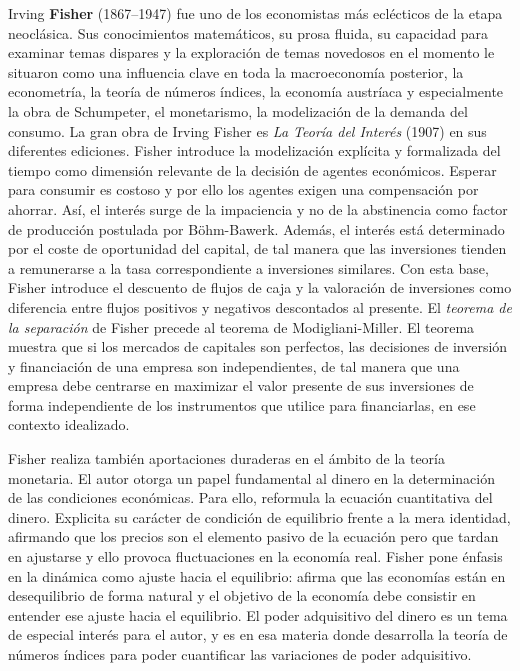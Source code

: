 \documentclass{nuevotema}
\begin{document}
Irving \textbf{Fisher} (1867--1947) fue uno de los economistas más eclécticos de la etapa neoclásica. Sus conocimientos matemáticos, su prosa fluida, su capacidad para examinar temas dispares y la exploración de temas novedosos en el momento le situaron como una influencia clave en toda la macroeconomía posterior, la econometría, la teoría de números índices, la economía austríaca y especialmente la obra de Schumpeter, el monetarismo, la modelización de la demanda del consumo. La gran obra de Irving Fisher es \textit{La Teoría del Interés} (1907) en sus diferentes ediciones. Fisher introduce la modelización explícita y formalizada del tiempo como dimensión relevante de la decisión de agentes económicos. Esperar para consumir es costoso y por ello los agentes exigen una compensación por ahorrar. Así, el interés surge de la impaciencia y no de la abstinencia como factor de producción postulada por Böhm-Bawerk. Además, el interés está determinado por el coste de oportunidad del capital, de tal manera que las inversiones tienden a remunerarse a la tasa correspondiente a inversiones similares. Con esta base, Fisher introduce el descuento de flujos de caja y la valoración de inversiones como diferencia entre flujos positivos y negativos descontados al presente. El \textit{teorema de la separación} de Fisher precede al teorema de Modigliani-Miller. El teorema muestra que si los mercados de capitales son perfectos, las decisiones de inversión y financiación de una empresa son independientes, de tal manera que una empresa debe centrarse en maximizar el valor presente de sus inversiones de forma independiente de los instrumentos que utilice para financiarlas, en ese contexto idealizado.

Fisher realiza también aportaciones duraderas en el ámbito de la teoría monetaria. El autor otorga un papel fundamental al dinero en la determinación de las condiciones económicas. Para ello, reformula la ecuación cuantitativa del dinero. Explicita su carácter de condición de equilibrio frente a la mera identidad, afirmando que los precios son el elemento pasivo de la ecuación pero que tardan en ajustarse y ello provoca fluctuaciones en la economía real. Fisher pone énfasis en la dinámica como ajuste hacia el equilibrio: afirma que las economías están en desequilibrio de forma natural y el objetivo de la economía debe consistir en entender ese ajuste hacia el equilibrio. El poder adquisitivo del dinero es un tema de especial interés para el autor, y es en esa materia donde desarrolla la teoría de números índices para poder cuantificar las variaciones de poder adquisitivo.
\end{document}
